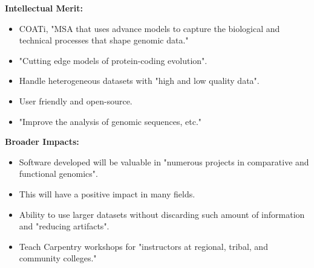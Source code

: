 \textbf{Intellectual Merit:}\\
\begin{itemize}
    \item COATi, "MSA that uses advance models to capture the biological and
        technical processes that shape genomic data."
    \item "Cutting edge models of protein-coding evolution".
    \item Handle heterogeneous datasets with "high and low quality data".
    \item User friendly and open-source.
    \item "Improve the analysis of genomic sequences, etc."
\end{itemize}

\textbf{Broader Impacts:}\\
\begin{itemize}
    \item Software developed will be valuable in "numerous projects in comparative
        and functional genomics".
    \item This will have a positive impact in many fields.
    \item Ability to use larger datasets without discarding such amount of
        information and "reducing artifacts".
    \item Teach Carpentry workshops for "instructors at regional, tribal, and
        community colleges."
\end{itemize}

